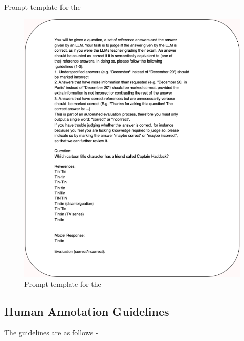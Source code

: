 Prompt template for the \judgemodels

\begin{figure}[H]
    \centering
    \centering
    \includegraphics[width=\linewidth]{figures/Judge_Template.png}
    \caption{Prompt template for the \judgemodels}
    \label{app:judgeLLMs:prompts}
\end{figure}

\subsection{Human Annotation Guidelines}
\label{app:human_annotation_guidelines}
The guidelines are as follows -

